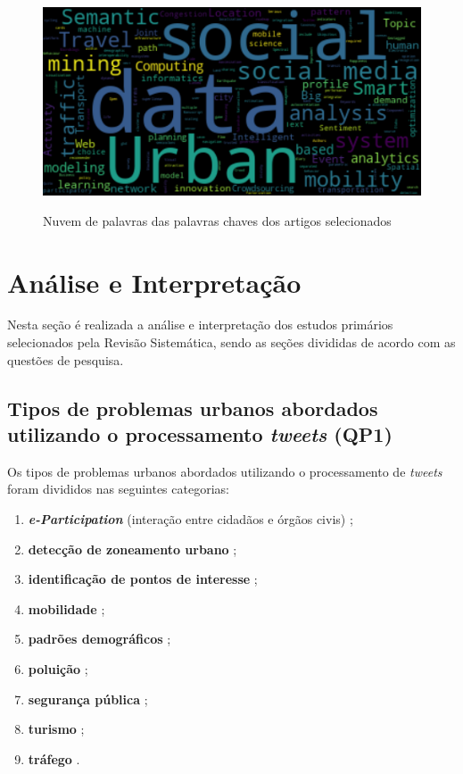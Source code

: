 \documentclass[
	12pt,				%
	oneside,			%
	a4paper,			%
	english,			%
	brazil				%
	]{abntex2ppgsi}
\begin{document}
{{{\begin{figure}[H]%
	\centering
 	  \caption{Nuvem de palavras das palavras chaves dos artigos selecionados}
		\includegraphics[width=0.8\linewidth]{images/world_cloud_metodologia.png}
	\label{fig:w_cloud}
\end{figure}

\section{Análise e Interpretação}
\label{analise}
Nesta seção é realizada a análise e interpretação dos estudos primários selecionados pela Revisão Sistemática, sendo as seções divididas de acordo com as questões de pesquisa.
\subsection{Tipos de problemas urbanos abordados utilizando o processamento \textit{tweets} (QP1)}

Os tipos de problemas urbanos abordados utilizando o processamento de \textit{tweets} foram divididos nas seguintes categorias: 

\begin{enumerate}
\item \textit{\textbf{e-Participation}} (interação entre  cidadãos  e órgãos civis) \cite{Mukherjee2015, Soomro2016};
\item \textbf{detecção de zoneamento urbano} \cite{Frias-Martinez2014};
\item \textbf{identificação de pontos de interesse} \cite{Farseev2015, Gutev2016, Bendler2014, Abbasi2015, Gkiotsalitis2015, Gkiotsalitis2016, Hasan2014, Maghrebi2015, DiLorenzo2013};
\item \textbf{mobilidade} \cite{Gutev2016, Chen2016, Yousaf2014};
\item \textbf{padrões demográficos} \cite{Farseev2015, Gutev2016, Steiger2015Census, Guo2016};
\item \textbf{poluição} \cite{Zagal2016};
\item \textbf{segurança pública} \cite{Wen2016, Mata2015};
\item \textbf{turismo} \cite{Thomaz2016, Abbasi2015, Chua2016, Sobolevsky2015};
\item \textbf{tráfego} \cite{Anantharam2015, Lecue2014}.
\end{enumerate}

}}}
\end{document}
